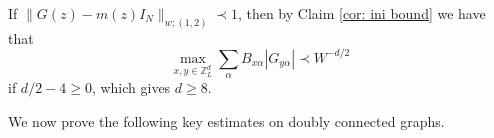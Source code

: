 \documentclass{article}
\newcommand{\1}{\mathds{1}}
\numberwithin{equation}{section}
\newcommand{\al}{\alpha}
\newcommand{\be}{\begin{equation}}
\newcommand{\ee}{\end{equation}}
\newcommand{\e}{{\varepsilon}}
\renewcommand{\cal}{\mathcal}
\newcommand{\wt}{\widetilde}
\renewcommand{\leq}{\leqslant}
\renewcommand{\geq}{\geqslant}
\renewcommand{\le}{\leq}
\renewcommand{\ge}{\geq}
\newcommand{\Z}{\mathbb{Z}}
\theoremstyle{plain} %
\theoremstyle{remark}
\newtheorem{remark}[theorem]{Remark}
\begin{document}
If $\|G(z)-m(z)I_N\|_{w;(1,2)}\prec 1$, %
then by Claim \ref{cor: ini bound} we have that
$$\max_{x,y\in \Z_L^d} \sum_{ \al }B_{x\al}|G_{y\al}| \prec  W^{- d/2} $$
if $d/2-4\ge 0$, which gives $d\ge 8$. 

We now prove the following key estimates on doubly connected graphs. %
 
\end{document}
